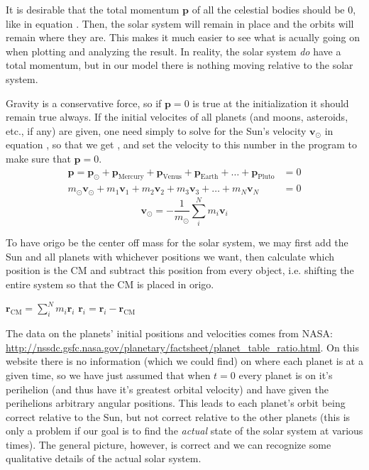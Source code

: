 It is desirable that the total momentum $\mathbf{p}$ of all the celestial bodies should be $0$, like in equation . Then, the solar system will remain in place and the orbits will remain where they are. This makes it much easier to see what is acually going on when plotting and analyzing the result. In reality, the solar system \emph{do} have a total momentum, but in our model there is nothing moving relative to the solar system.

Gravity is a conservative force, so if $\mathbf{p} = 0$ is true at the initialization it should remain true always. If the initial velocites of all planets (and moons, asteroids, etc., if any) are given, one need simply to solve for the Sun's velocity $\mathbf{v}_\odot$ in equation , so that we get , and set the velocity to this number in the program to make sure that $\mathbf{p} = 0$.
\begin{align}
	\label{eq:momentum_sum}
	\mathbf{p} =
	\mathbf{p}_\odot
	+ \mathbf{p}_\textrm{Mercury}
	+ \mathbf{p}_\textrm{Venus}
	+ \mathbf{p}_\textrm{Earth}
	+ \dots
	+ \mathbf{p}_\textrm{Pluto}
	&= 0 \\
	\label{eq:momentum_sun}
	m_\odot \mathbf{v}_\odot
	+ m_1 \mathbf{v}_1
	+ m_2 \mathbf{v}_2
	+ m_3 \mathbf{v}_3
	+ \dots
	+ m_N \mathbf{v}_N
	&= 0
\end{align}
\begin{equation}
    \label{eq:momentum_sum2}
    \mathbf{v}_\odot = - \frac{1}{m_\odot} \sum_i^N m_i \mathbf{v}_i
\end{equation}


To have origo be the center off mass for the solar system, we may first add the Sun and all planets with whichever positions we want, then calculate which position is the CM and subtract this position from every object, i.e. shifting the entire system so that the CM is placed in origo.
\begin{algorithmic}
    \State $ \mathbf{r}_{\textrm{CM}} = \sum_i^N m_i \mathbf{r}_i $
        \State $ \mathbf{r}_i = \mathbf{r}_i - \mathbf{r}_{\textrm{CM}} $
    \EndFor
\end{algorithmic}

The data on the planets' initial positions and velocities comes from NASA: \url{http://nssdc.gsfc.nasa.gov/planetary/factsheet/planet_table_ratio.html}. On this website there is no information (which we could find) on where each planet is at a given time, so we have just assumed that when $t=0$ every planet is on it's perihelion (and thus have it's greatest orbital velocity) and have given the perihelions arbitrary angular positions. This leads to each planet's orbit being correct relative to the Sun, but not correct relative to the other planets (this is only a problem if our goal is to find the \emph{actual} state of the solar system at various times). The general picture, however, is correct and we can recognize some qualitative details of the actual solar system.
